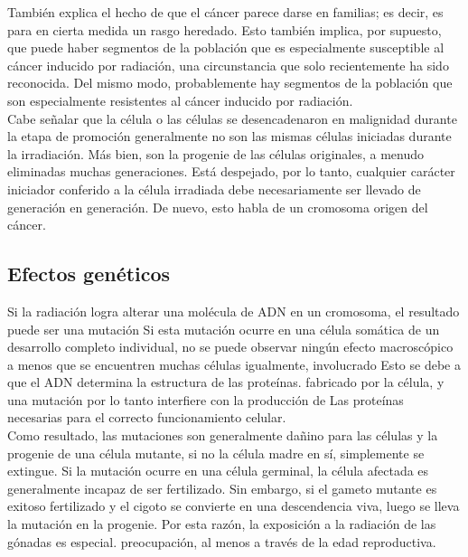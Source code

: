 \documentclass[]{article}
\begin{document}
También explica el hecho de que el cáncer parece darse en familias; es decir, es para en cierta medida un rasgo heredado. Esto también implica, por supuesto, que puede haber segmentos de la población que es especialmente susceptible al cáncer inducido por radiación, una circunstancia que solo recientemente ha sido reconocida. Del mismo modo, probablemente hay segmentos de la población que son especialmente resistentes al cáncer inducido por radiación.\\

Cabe señalar que la célula o las células se desencadenaron en malignidad durante la etapa de promoción generalmente no son las mismas células iniciadas durante la irradiación. Más bien,
son la progenie de las células originales, a menudo eliminadas muchas generaciones. Está despejado, por lo tanto, cualquier carácter iniciador conferido a la célula irradiada debe 
necesariamente ser llevado de generación en generación. De nuevo, esto habla de un cromosoma origen del cáncer.\\

\subsection{Efectos genéticos}

Si la radiación logra alterar una molécula de ADN en un cromosoma, el resultado puede ser una mutación Si esta mutación ocurre en una célula somática de un desarrollo completo individual, no se puede observar ningún efecto macroscópico a menos que se encuentren muchas células igualmente, involucrado Esto se debe a que el ADN determina la estructura de las proteínas.
fabricado por la célula, y una mutación por lo tanto interfiere con la producción de Las proteínas necesarias para el correcto funcionamiento celular.\\

Como resultado, las mutaciones son generalmente dañino para las células y la progenie de una célula mutante, si no la célula madre
en sí, simplemente se extingue. Si la mutación ocurre en una célula germinal, la célula afectada es
generalmente incapaz de ser fertilizado. Sin embargo, si el gameto mutante es exitoso fertilizado y el cigoto se convierte en una descendencia viva, luego se lleva la mutación en la progenie. Por esta razón, la exposición a la radiación de las gónadas es especial. preocupación, al menos a través de la edad reproductiva.\\
\end{document}
